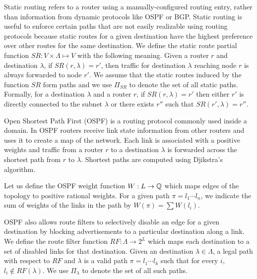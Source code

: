  Static routing refers to a router using a
manually-configured routing entry, rather than information from
dynamic protocols like OSPF or BGP.  Static routing is useful to enforce certain
paths that are not easily realizable using routing protocols because 
static
routes for a given destination have the highest preference over other routes for the same
destination.  
We define the static route partial
function $SR: V \times \Lambda \mapsto V$ with the following meaning. 
Given a router $r$
and destination $\lambda$, if $SR(r,\lambda)=r'$, then traffic for
destination $\lambda$ reaching node $r$ is always forwarded to node
$r'$. We assume that  the static routes induced by the function $SR$ form paths and
we use $\Pi_{SR}$ to denote the set of all  static paths. 
Formally, for a destination $\lambda$ and a router $r$, if $SR(r,\lambda)=r'$ then
either $r'$ is directly connected to the subnet $\lambda$ or there exists $r''$ such that $SR(r',\lambda)=r''$.


 Open Shortest Path First (OSPF) is a routing
protocol commonly used inside a domain. In OSPF routers receive link
state information from other routers and uses it to create a map of
the network. Each link is associated with a positive weights and traffic from a router $r$ to
a destination $\lambda$ is forwarded across the shortest path from $r$ to $\lambda$.
Shortest paths are computed using Djikstra's algorithm.

Let us
define the OSPF weight function $W: L \rightarrow \mathbb{Q}$ which 
maps edges of the topology to positive rational weights. 
For a given
path $\pi=l_1\cdots l_n$, we indicate the sum of weights of the
links in the path by $W(\pi)=\sum W(l_i)$. 


OSPF also allows  route filters
to selectively disable an
edge for a given destination by  
blocking advertisements to a
particular destination along a link. 
We define the  route filter function 
$RF: \Lambda \rightarrow 2^L$ which maps each destination  
to a set of disabled links for that destination. 
Given an   destination $\lambda\in \Lambda$, 
a legal path with respect to $RF$ and $\lambda$
is a valid path $\pi=l_1\cdots l_k$ such that for every $i$,
$l_i\not\in RF(\lambda)$.
We use $\Pi_\lambda$ to denote the set of all such paths.

